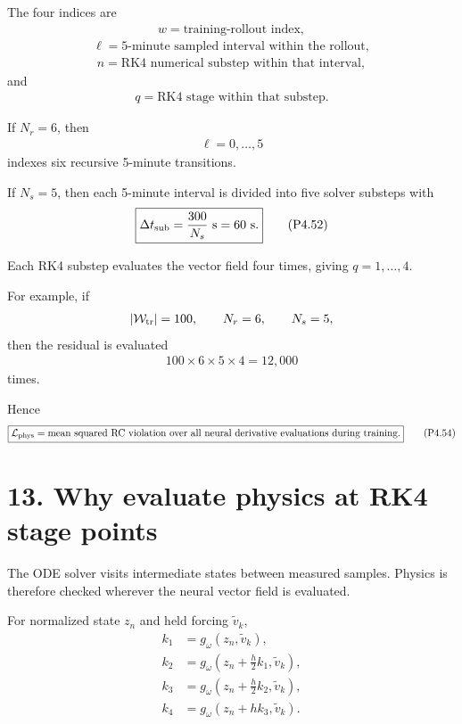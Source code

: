 \documentclass[11pt]{article}
\begin{document}
The four indices are
\begin{align}
\boxed{w=\text{training-rollout index},}
\tag{P4.48}
\end{align}
\begin{align}
\boxed{\ell=\text{5-minute sampled interval within the rollout},}
\tag{P4.49}
\end{align}
\begin{align}
\boxed{n=\text{RK4 numerical substep within that interval},}
\tag{P4.50}
\end{align}
and
\begin{align}
\boxed{q=\text{RK4 stage within that substep}.}
\tag{P4.51}
\end{align}

If \(N_r=6\), then
\begin{align}
\ell=0,\ldots,5
\end{align}
indexes six recursive 5-minute transitions.

If \(N_s=5\), then each 5-minute interval is divided into five solver substeps with
\begin{align}
\boxed{
\Delta t_{\rm sub}
=
\frac{300}{N_s}\ {\rm s}
=
60\ {\rm s}.
}
\tag{P4.52}
\end{align}

Each RK4 substep evaluates the vector field four times, giving \(q=1,\ldots,4\).

For example, if
\begin{align}
|\mathcal W_{\rm tr}|=100,\qquad N_r=6,\qquad N_s=5,
\end{align}
then the residual is evaluated
\begin{align}
\boxed{
100\times6\times5\times4=12{,}000
}
\tag{P4.53}
\end{align}
times.

Hence
\begin{align}
\boxed{
\mathcal L_{\rm phys}
=
\text{mean squared RC violation over all neural derivative evaluations during training}.
}
\tag{P4.54}
\end{align}

\section*{13. Why evaluate physics at RK4 stage points}

The ODE solver visits intermediate states between measured samples. Physics is therefore checked wherever the neural vector field is evaluated.

For normalized state \(z_n\) and held forcing \(\widetilde v_k\),
\begin{align}
k_1&=g_\omega(z_n,\widetilde v_k),\\
k_2&=g_\omega\left(z_n+\frac{h}{2}k_1,\widetilde v_k\right),\\
k_3&=g_\omega\left(z_n+\frac{h}{2}k_2,\widetilde v_k\right),\\
k_4&=g_\omega\left(z_n+hk_3,\widetilde v_k\right).
\end{align}
\end{document}
